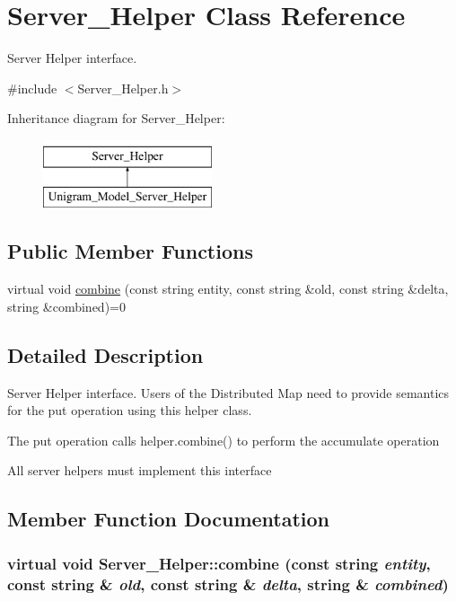 \hypertarget{class_server___helper}{
\section{Server\_\-Helper Class Reference}
\label{class_server___helper}
}


Server Helper interface.  




{\ttfamily \#include $<$Server\_\-Helper.h$>$}

Inheritance diagram for Server\_\-Helper:\begin{figure}[H]
\begin{center}
\leavevmode
\includegraphics[height=2cm]{class_server___helper}
\end{center}
\end{figure}
\subsection*{Public Member Functions}
\begin{DoxyCompactItemize}
\item 
virtual void \hyperlink{class_server___helper_a8dbb2fd15cdfcb6464a965893482b775}{combine} (const string entity, const string \&old, const string \&delta, string \&combined)=0
\end{DoxyCompactItemize}


\subsection{Detailed Description}
Server Helper interface. Users of the Distributed Map need to provide semantics for the put operation using this helper class.

The put operation calls helper.combine() to perform the accumulate operation

All server helpers must implement this interface 

\subsection{Member Function Documentation}
\hypertarget{class_server___helper_a8dbb2fd15cdfcb6464a965893482b775}{
\subsubsection[{combine}]{\setlength{\rightskip}{0pt plus 5cm}virtual void Server\_\-Helper::combine (const string {\em entity}, \/  const string \& {\em old}, \/  const string \& {\em delta}, \/  string \& {\em combined})}}
\label{class_server___helper_a8dbb2fd15cdfcb6464a965893482b775}


